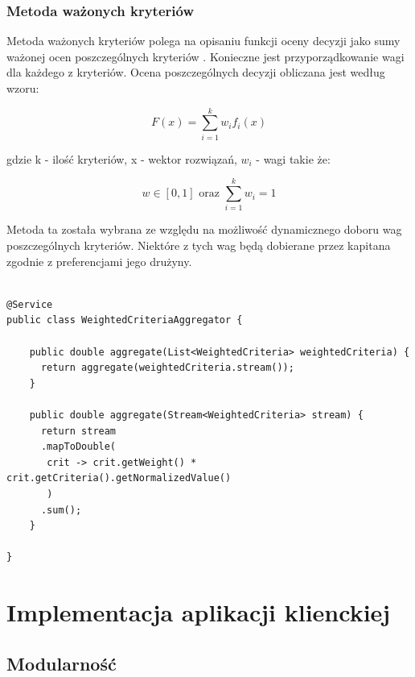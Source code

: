 \subsubsection{Metoda ważonych kryteriów}

Metoda ważonych kryteriów polega na opisaniu funkcji oceny decyzji jako sumy ważonej ocen poszczególnych kryteriów \cite{analizawielok}. Konieczne jest przyporządkowanie wagi dla każdego z kryteriów. Ocena poszczególnych decyzji obliczana jest według wzoru: 

\begin{equation}\label{eq:mwk}
F(x)=\sum_{i=1}^{k}w_{i}f_{i}(x)
\end{equation}

gdzie k - ilość kryteriów, x - wektor rozwiązań, $w_{i}$ - wagi takie że:

\begin{equation}
w \in [0, 1] \mbox{ oraz } \sum_{i=1}^{k}w_{i} = 1
\end{equation}

Metoda ta została wybrana ze względu na możliwość dynamicznego doboru wag poszczególnych kryteriów. Niektóre z tych wag będą dobierane przez kapitana zgodnie z preferencjami jego drużyny. 


\begin{minipage}{\linewidth}
\begin{lstlisting}[label=list:resource, caption=Klasa agregująca za pomocą metody ważonych kryteriów, basicstyle=\footnotesize\ttfamily]

@Service
public class WeightedCriteriaAggregator {

    public double aggregate(List<WeightedCriteria> weightedCriteria) {
      return aggregate(weightedCriteria.stream());
    }

    public double aggregate(Stream<WeightedCriteria> stream) {
      return stream
      .mapToDouble(
       crit -> crit.getWeight() * crit.getCriteria().getNormalizedValue()
       )
      .sum();
    }

}

\end{lstlisting}
\end{minipage}

\section{Implementacja aplikacji klienckiej}

\subsection{Modularność}

